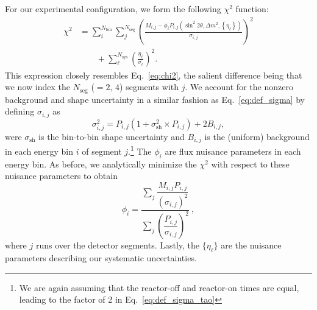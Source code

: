 \documentclass[prd, twocolumn, tightenlines, twoside, secnumarabic, superscriptaddress, preprintnumbers, nofootinbib, notitlepage]{revtex4-1}
\begin{document}
For our experimental configuration, we form the following $\chi^2$ function:
\begin{align}
    \chi^2 & = \sum_{i}^{N_\text{bin}} \sum_{j}^{N_\text{seg}} \left(\frac{M_{i,j} - \phi_i P_{i,j}\left(\sin^2 2\theta, \Delta m^2, \left\{ \eta_\ell \right\} \right)}{\sigma_{i,j}}\right)^2 \nonumber \\
    & \qquad + \sum_\ell^{N_\text{sys}} \left( \frac{\eta_\ell}{\sigma_\ell} \right)^2 .
    \label{eq:chi2_tao}
\end{align}
This expression closely resembles Eq.~\eqref{eq:chi2}, the salient difference being that we now index the $N_\text{seg}$ ($=2,\,4$) segments with $j$. We account for the nonzero background and shape uncertainty in a similar fashion as Eq.~\eqref{eq:def_sigma} by defining $\sigma_{i,j}$ as 
    \begin{equation}
        \sigma_{i,j}^2 = P_{i,j}(1+\sigma_{\text{sh}}^2 \times P_{i,j}) + 2 B_{i,j},
        \label{eq:def_sigma_tao}
    \end{equation}
were $\sigma_{\text{sh}}$ is the bin-to-bin shape uncertainty and $B_{i,j}$ is the (uniform) background in each energy bin $i$ of segment $j$.\footnote{We are again assuming that the reactor-off and reactor-on times are equal, leading to the factor of 2 in Eq.~\eqref{eq:def_sigma_tao}} The $\phi_i$ are flux nuisance parameters in each energy bin. As before, we analytically minimize the $\chi^2$ with respect to these nuisance parameters to obtain
    \begin{equation}
        \phi_i = \frac{ \sum_{j} \dfrac{M_{i,j} P_{i,j}}{(\sigma_{i,j})^2}}{\sum_{j} \left(\dfrac{ P_{i,j}}{\sigma_{i,j}}\right)^2} ~,
        \label{eq:phi_tao}
    \end{equation} 
where $j$ runs over the detector segments. Lastly, the $\{\eta_\ell\}$ are the nuisance parameters describing our systematic uncertainties.
\end{document}

